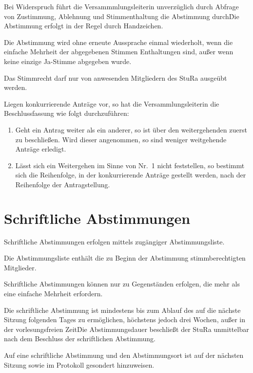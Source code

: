 \begin{multicols}{2}
\Abs \Satz Bei Widerspruch führt die Versammmlungsleiterin unverzüglich durch Abfrage von Zustimmung, Ablehnung und Stimmenthaltung die Abstimmung durch\. Die Abstimmung erfolgt in der Regel durch Handzeichen.

\Abs \Satz Die Abstimmung wird ohne erneute Aussprache einmal wiederholt, wenn die einfache Mehrheit der abgegebenen Stimmen Enthaltungen sind, außer wenn keine einzige Ja-Stimme abgegeben wurde.

\Abs \Satz Das Stimmrecht darf nur von anwesenden Mitgliedern des StuRa ausgeübt werden.

\Abs \Satz Liegen konkurrierende Anträge vor, so hat die Versammlungsleiterin die Beschlussfassung wie folgt durchzuführen:
\begin{enumerate}
\item Geht ein Antrag weiter als ein anderer, so ist über den weitergehenden zuerst zu beschließen. Wird dieser angenommen, so sind weniger weitgehende Anträge erledigt.
\item Lässt sich ein Weitergehen im Sinne von Nr.~1 nicht feststellen, so bestimmt sich die Reihenfolge, in der konkurrierende Anträge gestellt werden, nach der Reihenfolge der Antragstellung.
\end{enumerate}



\section{Schriftliche Abstimmungen}

\Abs \Satz Schriftliche Abstimmungen erfolgen mittels zugängiger Abstimmungsliste.

\Abs \Satz Die Abstimmungsliste enthält die zu Beginn der Abstimmung stimmberechtigten Mitglieder.

\Abs \Satz Schriftliche Abstimmungen können nur zu Gegenständen erfolgen, die mehr als eine einfache Mehrheit erfordern.

\Abs \Satz Die schriftliche Abstimmung ist mindestens bis zum Ablauf des auf die nächste Sitzung folgenden Tages zu ermöglichen, höchstens jedoch drei Wochen, außer in der vorlesungsfreien Zeit\. Die Abstimmungsdauer beschließt der StuRa unmittelbar nach dem Beschluss der schriftlichen Abstimmung.

\Abs \Satz Auf eine schriftliche Abstimmung und den Abstimmungsort ist auf der nächsten Sitzung sowie im Protokoll gesondert hinzuweisen.




\end{multicols}
